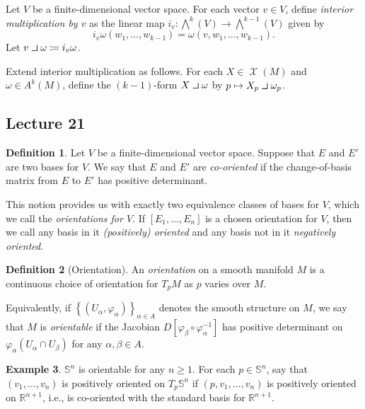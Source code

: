 \documentclass[10pt,letterpaper,cm]{nupset}
\theoremstyle{definition}
\newtheorem{definition}{Definition}[subsection]
\newtheorem{exmp}[definition]{Example}
\theoremstyle{theorem}
\theoremstyle{remark}
\newcommand{\R}{\mathbb R}
\renewcommand{\S}{\mathbb S}
\newcommand{\1}{\mathbf{1}}
\newcommand{\0}{\vec 0}
\newcommand{\intprodl}{%
    \mathbin{\scalebox{1.5}{$\lrcorner$}}%
}
\DeclareMathOperator{\vf}{\mathscr{X}}
\begin{document}
\smallskip

Let $V$ be a finite-dimensional vector space. For each vector $v\in V$, define \textit{interior multiplication by $v$} as the linear map $i_v: \bigwedge^k(V) \to \bigwedge^{k-1}(V)$ given by $$i_v \omega(w_1, \ldots, w_{k-1})= \omega(v, w_1, \ldots, w_{k-1}).$$ Let $v \intprodl \omega \coloneqq  i_v \omega$.

\smallskip
 
 Extend interior multiplication as follows. For each $X \in \vf(M)$ and $\omega \in A^k(M)$, define the $(k-1)$-form $X \intprodl \omega$ by $p\mapsto  X_p \intprodl \omega_p$.


\subsection{Lecture 21}

\begin{definition}
Let $V$ be a finite-dimensional vector space. Suppose that $E$ and $E'$ are two bases for $V$. We say that $E$ and $E'$ are \textit{co-oriented} if the change-of-basis matrix from $E$ to $E'$   has positive determinant.
\end{definition}

This notion provides us with exactly two equivalence classes of bases for $V$, which we call the \textit{orientations for $V$}. If $\left[E_1, \ldots, E_n\right]$ is a chosen orientation for $V$, then we call any basis in it \textit{(positively) oriented} and any basis not in it \textit{negatively oriented}.

\begin{definition}[Orientation]
An \textit{orientation} on a smooth manifold $M$ is a continuous choice of orientation for $T_pM$ as $p$ varies over $M$. 
\end{definition}

Equivalently, if $\left\{(U_{\alpha}, \varphi_{\alpha})\right\}_{\alpha \in A}$ denotes the smooth structure on $M$, we say that $M$ is \textit{orientable} if the Jacobian $D\left[\varphi_{\beta} \circ \varphi_{\alpha}^{-1}\right]$ has positive determinant on $\varphi_{\alpha}(U_{\alpha}\cap U_{\beta})$ for any $\alpha, \beta \in A$.


\begin{exmp}
$\S^n$ is orientable for any $n\geq 1$. For each $p \in \S^n$, say that $(v_1, \ldots, v_n)$ is positively oriented on $T_p\S^n$ if $\left(p, v_1, \ldots, v_n\right)$ is positively oriented on $\R^{n+1}$, i.e., is co-oriented with the standard basis for $\R^{n+1}$.
\end{exmp}
\end{document}
